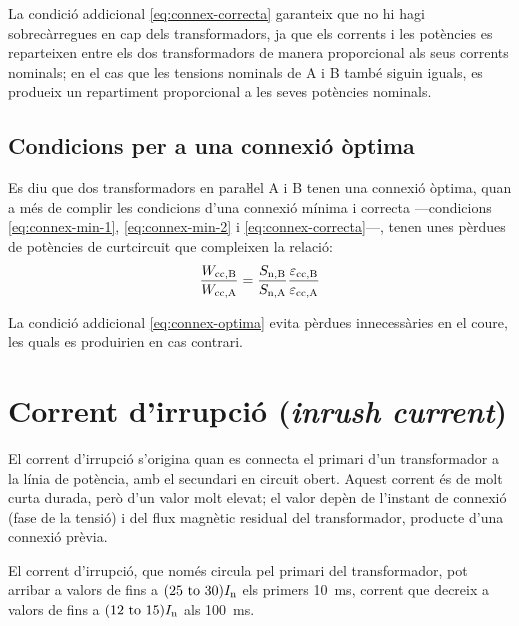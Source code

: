 La condició addicional  \eqref{eq:connex-correcta} garanteix que no hi hagi sobrecàrregues en cap dels transformadors, ja que els corrents i les potències es reparteixen entre els dos transformadors de manera proporcional als seus corrents nominals; en el cas que les tensions nominals de A i B també siguin  iguals, es produeix un repartiment proporcional a les seves potències nominals.


\subsection{Condicions per a una connexió òptima}\label{sec:connex-optima}

 Es diu que dos transformadors en paraŀlel A i B tenen una connexió òptima, quan a més de complir les condicions d'una connexió mínima i correcta ---condicions \eqref{eq:connex-min-1}, \eqref{eq:connex-min-2} i \eqref{eq:connex-correcta}---, tenen unes pèrdues de potències de curtcircuit que compleixen la relació:
\begin{equation}
    \frac{W_\mathrm{cc,B}}{W_\mathrm{cc,A}} = \frac{S_\mathrm{n,B}}{S_\mathrm{n,A}} \frac{\varepsilon_\mathrm{cc,B}}{\varepsilon_\mathrm{cc,A}} \label{eq:connex-optima}
\end{equation}

La condició addicional \eqref{eq:connex-optima} evita pèrdues innecessàries en el coure, les quals es produirien en cas contrari.


\section{Corrent d'irrupció (\textit{inrush current})}

El corrent d'irrupció s'origina quan es  connecta el primari d'un transformador a la línia de potència, amb el secundari en circuit obert. Aquest corrent és de molt curta durada, però d'un valor molt elevat; el valor depèn de l'instant de connexió (fase de la tensió) i del flux magnètic residual del transformador, producte d'una connexió prèvia.

El corrent d'irrupció, que només circula pel primari del transformador, pot arribar a valors de fins a $(\numrange{25}{30}) I\ped{n}$ els primers \qty{10}{ms}, corrent que decreix a valors de fins  a $(\numrange{12}{15}) I\ped{n}$ als \qty{100}{ms}.

